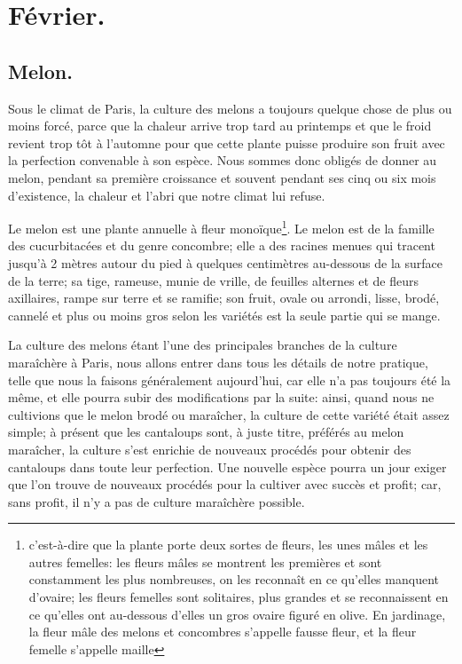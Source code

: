 \documentclass[10pt,a4paper]{book}
\begin{document}
\section{Février.}

\subsection{Melon.}

Sous le climat de Paris, la culture des melons a toujours quelque chose de plus ou moins forcé, parce que la chaleur arrive trop tard au printemps et que le froid revient trop tôt à l'automne pour que cette plante puisse produire son fruit avec la perfection convenable à son espèce. Nous sommes donc obligés de donner au melon, pendant sa première croissance et souvent pendant ses cinq ou six mois d'existence, la chaleur et l'abri que notre climat lui refuse.

Le melon est une plante annuelle à fleur monoïque\footnote{c'est-à-dire que la plante porte deux sortes de fleurs, les unes mâles et les autres femelles: les fleurs mâles se montrent les premières et sont constamment les plus nombreuses, on les reconnaît en ce qu'elles manquent d'ovaire; les fleurs femelles sont solitaires, plus grandes et se reconnaissent en ce qu'elles ont au-dessous d'elles un gros ovaire figuré en olive. En jardinage, la fleur mâle des melons et concombres s'appelle fausse fleur, et la fleur femelle s'appelle maille}. Le melon est de la famille des cucurbitacées et du genre concombre; elle a des racines menues qui tracent jusqu'à 2 mètres autour du pied à quelques centimètres au-dessous de la surface de la terre; sa tige, rameuse, munie de vrille, de feuilles alternes et de fleurs axillaires, rampe sur terre et se ramifie; son fruit, ovale ou arrondi, lisse, brodé, cannelé et plus ou moins gros selon les variétés est la seule partie qui se mange.

La culture des melons étant l'une des principales branches de la culture maraîchère à Paris, nous allons entrer dans tous les détails de notre pratique, telle que nous la faisons généralement aujourd'hui, car elle n'a pas toujours été la même, et elle pourra subir des modifications par la suite: ainsi, quand nous ne cultivions que le melon brodé ou maraîcher, la culture de cette variété était assez simple; à présent que les cantaloups sont, à juste titre, préférés au melon maraîcher, la culture s'est enrichie de nouveaux procédés pour obtenir des cantaloups dans toute leur perfection. Une nouvelle espèce pourra un jour exiger que l'on trouve de nouveaux procédés pour la cultiver avec succès et profit; car, sans profit, il n'y a pas de culture maraîchère possible.
\end{document}
